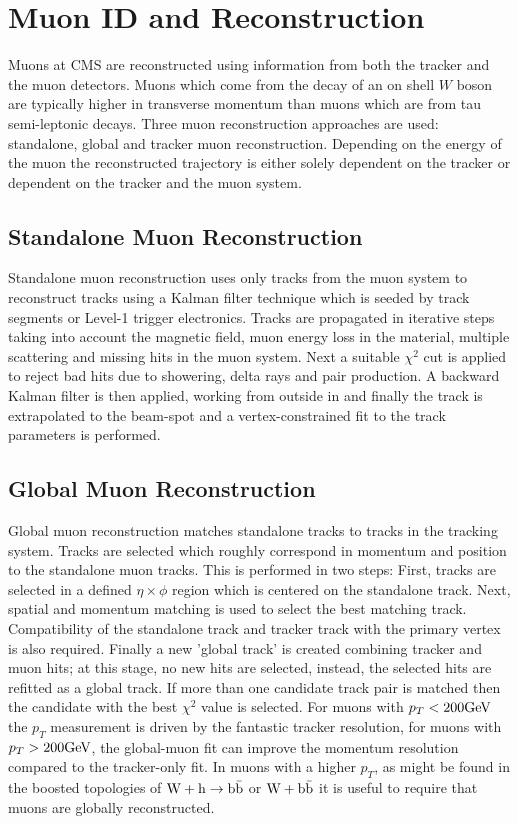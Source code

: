 \section{Muon ID and Reconstruction}
Muons at CMS are reconstructed using information from both the 
tracker and the muon detectors. Muons which come from the decay
of an on shell $W$ boson are typically higher in transverse momentum
than muons which are from tau semi-leptonic decays.
Three muon reconstruction approaches are used: standalone,
global and tracker muon reconstruction. Depending on the 
energy of the muon the reconstructed trajectory is either
solely dependent on the tracker or dependent on the tracker
and the muon system.
\subsection{Standalone Muon Reconstruction}
Standalone muon reconstruction uses only tracks from the muon system
to reconstruct tracks using a Kalman filter technique which is seeded
by track segments or Level-1 trigger electronics. Tracks are propagated
in iterative steps taking into account the magnetic field, muon energy loss in the material,
multiple scattering and missing hits in the muon system.
Next a suitable $\chi^{2}$ cut is applied to reject bad hits due to showering,
delta rays and pair production. A backward Kalman filter is then applied,
working from outside in and finally the track is extrapolated to the 
beam-spot and a vertex-constrained fit to the track
parameters is performed.
\subsection{Global Muon Reconstruction}
Global muon reconstruction matches standalone 
tracks to tracks in the tracking system. 
Tracks are selected which roughly correspond in momentum and position to 
the standalone muon tracks. This is performed in two steps: First,
tracks are selected in a defined $\eta\times\phi$ region which is centered
on the standalone track. Next, spatial and momentum matching is 
used to select the best matching track. Compatibility of the 
standalone track and tracker track with the 
primary vertex is also required. Finally a new 'global track' is created combining
tracker and muon hits; at this stage, no new hits are selected, instead, 
the selected hits are refitted as a global track. If more than one candidate
track pair is matched then the candidate with the best $\chi^{2}$ value
is selected. 
For muons with $p_{T}<200\mathrm{GeV}$ the $p_{T}$ measurement is driven
by the fantastic tracker resolution, for muons with $p_{T}>200\mathrm{GeV}$,
the global-muon fit can improve the momentum resolution compared
to the tracker-only fit.
In muons with a higher $p_{T}$, as might be found
in the boosted topologies of $\mathrm{W+h\rightarrow\mathrm{b\bar{b}}}$ or $\mathrm{W+\mathrm{b\bar{b}}}$ it is useful to require that muons
are globally reconstructed.
